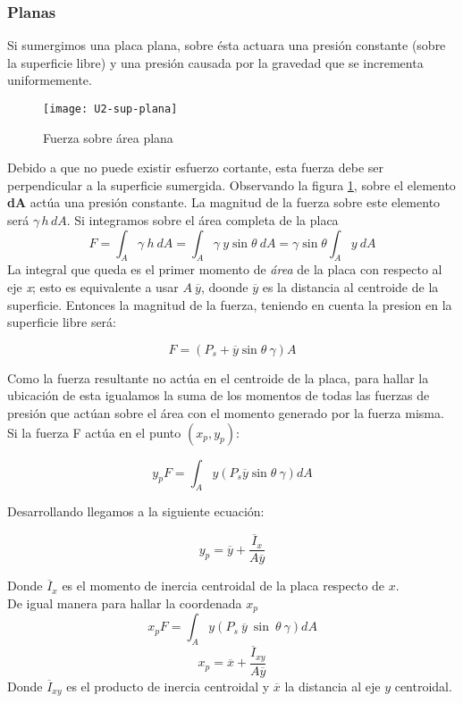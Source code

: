 \subsubsection{Planas}
Si sumergimos una placa plana, sobre ésta actuara una presión constante (sobre la superficie libre) y una presión causada por la gravedad que se incrementa uniformemente.
\begin{figure}[h]
	\centering
	\texttt{[image: U2-sup-plana]}
	\caption{Fuerza sobre área plana}
	\label{fig:sup-plana}
\end{figure}
Debido a que no puede existir esfuerzo cortante, esta fuerza debe ser perpendicular a la superficie sumergida. Observando la figura \ref{fig:sup-plana}, sobre el elemento \textbf{dA} actúa una presión constante. La magnitud de la fuerza sobre este elemento será $\gamma \, h \, dA$. Si integramos sobre el área completa de la placa
\begin{equation*}
	F = \int_{A} \gamma \ h \ dA = \int_{A} \gamma \ y \sin \theta \ dA =  \gamma \sin \theta \int_{A} y \ dA
\end{equation*}
La integral que queda es el primer momento de \emph{área} de la placa con respecto al eje \emph{x}; esto es equivalente a usar \textbf{$A \ \overline{y}$}, doonde $\overline{y}$ es la distancia al centroide de la superficie. Entonces la magnitud de la fuerza, teniendo en cuenta la presion en la superficie libre será:

\begin{equation}
	F =(P_{s} + \overline{y} \sin \theta \ \gamma) A
\end{equation}

Como la fuerza resultante no actúa en el centroide de la placa, para hallar la ubicación de esta igualamos la suma de los momentos de todas las fuerzas de presión que actúan sobre el área con el momento generado por la fuerza misma. Si la fuerza F actúa en el punto $(x_{p}, y_{p})$:

\begin{equation*}
	y_{p} F = \int_{A} y (P_{s} \overline{y} \sin \theta \ \gamma ) dA
\end{equation*}

Desarrollando llegamos a la siguiente ecuación:

\begin{equation}
	y_{p} = \overline{y} + \dfrac{\overline{I}_{x}}{A \overline{y}}
\end{equation}

Donde $\overline{I}_{x}$ es el momento de inercia centroidal de la placa respecto de $x$.
\\
De igual manera para hallar la coordenada $x_{p}$
\begin{equation*}
	x_{p} F = \int_{A} y (P_{s} \ \overline{y} \ \sin \ \theta \ \gamma ) dA
\end{equation*}
\begin{equation}
	x_{p} = \overline{x} + \dfrac{\overline{I}_{xy}}{A \overline{y}}
\end{equation}
Donde $\overline{I}_{xy}$ es el producto de inercia centroidal y $\overline{x}$ la distancia al eje $y$ centroidal.

